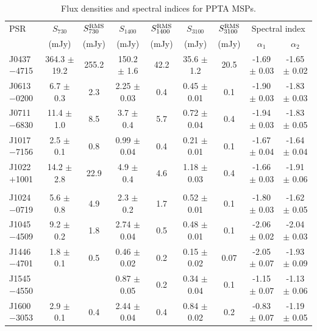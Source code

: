 \documentclass[useAMS,usenatbib]{mn2e}
\begin{document}
\begin{table}
\centering
\caption{Flux densities and spectral indices for PPTA MSPs.}
\label{tableFlux}
\begin{tabular}{lcccccccc}
\hline
PSR              & $S_{730}$&$S^{\rm{RMS}}_{730}$&$S_{1400}$&$S^{\rm{RMS}}_{1400}$&$S_{3100}$&$S^{\rm{RMS}}_{3100}$& \multicolumn{2}{c}{Spectral index} \\
								 &  (mJy)   &    (mJy)           & (mJy)    &    (mJy)            &  (mJy)   &    (mJy)            &   $\alpha_{1}$ & $\alpha_{2}$ \\
\hline
 J0437$-$4715  &  364.3 $\pm$ 19.2 &  255.2 &  150.2 $\pm$ 1.6  &  42.2 &  35.6 $\pm$ 1.2  &  20.5  &  -1.69 $\pm$ 0.03 &  -1.65 $\pm$ 0.02 \\ 
 J0613$-$0200  &  6.7   $\pm$ 0.3  &  2.3   &  2.25  $\pm$ 0.03 &  0.4  &  0.45 $\pm$ 0.01 &  0.1   &  -1.90 $\pm$ 0.03 &  -1.83 $\pm$ 0.03 \\ 
 J0711$-$6830  &  11.4  $\pm$ 1.0  &  8.5   &  3.7   $\pm$ 0.4  &  5.7  &  0.72 $\pm$ 0.04 &  0.4   &  -1.94 $\pm$ 0.03 &  -1.83 $\pm$ 0.05 \\ 
 J1017$-$7156  &  2.5   $\pm$ 0.1  &  0.8   &  0.99  $\pm$ 0.04 &  0.4  &  0.21 $\pm$ 0.01 &  0.1   &  -1.67 $\pm$ 0.04 &  -1.64 $\pm$ 0.04 \\ 
 J1022$+$1001  &  14.2  $\pm$ 2.8  &  22.9  &  4.9   $\pm$ 0.4  &  4.6  &  1.18 $\pm$ 0.03 &  0.4   &  -1.66 $\pm$ 0.03 &  -1.91 $\pm$ 0.06 \\ 
               &	                 &        &                   &       &                  &        &                   &                   \\ 
 J1024$-$0719  &  5.6   $\pm$ 0.8  &  4.9   &  2.3   $\pm$ 0.2  &  1.7  &  0.52 $\pm$ 0.01 &  0.1   &  -1.80 $\pm$ 0.03 &  -1.62 $\pm$ 0.05 \\ 
 J1045$-$4509  &  9.2   $\pm$ 0.2  &  1.8   &  2.74  $\pm$ 0.04 &  0.5  &  0.48 $\pm$ 0.01 &  0.1   &  -2.06 $\pm$ 0.02 &  -2.04 $\pm$ 0.03 \\ 
 J1446$-$4701  &  1.8   $\pm$ 0.1  &  0.5   &  0.46  $\pm$ 0.02 &  0.2  &  0.15 $\pm$ 0.02 &  0.07  &  -2.05 $\pm$ 0.07 &  -1.93 $\pm$ 0.09 \\ 
 J1545$-$4550  &                   &        &  0.87  $\pm$ 0.05 &  0.2  &  0.34 $\pm$ 0.04 &  0.1   &  -1.15 $\pm$ 0.07 &  -1.13 $\pm$ 0.06 \\ 
 J1600$-$3053  &  2.9   $\pm$ 0.1  &  0.4   &  2.44  $\pm$ 0.04 &  0.4  &  0.84 $\pm$ 0.02 &  0.2   &  -0.83 $\pm$ 0.07 &  -1.19 $\pm$ 0.05 \\ 

\end{tabular}
\end{table}
\end{document}
